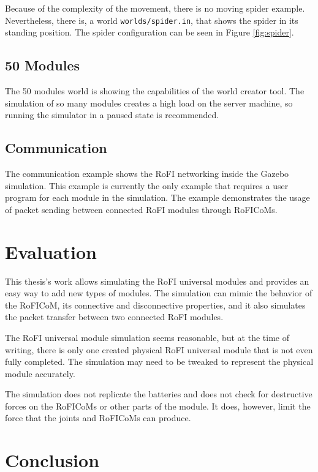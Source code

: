 \documentclass[
  printed, %
  color,   %
  notable, %
  oneside, %
  nolof,   %
  nolot,   %
  nocover,
]{fithesis3}
\newcommand{\code}[1]{\texttt{#1}}
\begin{document}
Because of the complexity of the movement, there is no moving spider example.
Nevertheless, there is, a world \code{worlds/spider.in}, that shows the spider in its standing position.
The spider configuration can be seen in Figure \ref{fig:spider}.

\section{50 Modules}

The 50 modules world is showing the capabilities of the world creator tool.
The simulation of so many modules creates a high load on the server machine, so running the simulator in a paused state is recommended.

\section{Communication}

The communication example shows the RoFI networking inside the Gazebo simulation.
This example is currently the only example that requires a user program for each module in the simulation.
The example demonstrates the usage of packet sending between connected RoFI modules through RoFICoMs.


\chapter{Evaluation}

This thesis's work allows simulating the RoFI universal modules and provides an easy way to add new types of modules.
The simulation can mimic the behavior of the RoFICoM, its connective and disconnective properties, and it also simulates the packet transfer between two connected RoFI modules.

The RoFI universal module simulation seems reasonable, but at the time of writing, there is only one created physical RoFI universal module that is not even fully completed.
The simulation may need to be tweaked to represent the physical module accurately.

The simulation does not replicate the batteries and does not check for destructive forces on the RoFICoMs or other parts of the module.
It does, however, limit the force that the joints and RoFICoMs can produce.


\chapter{Conclusion}
\end{document}
